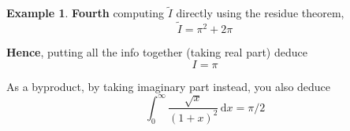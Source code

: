 \documentclass[a4paper, 12pt]{article}
\theoremstyle{definition}
\newtheorem{example}{Example}
\numberwithin{theorem}{section}
\numberwithin{definition}{section}
\numberwithin{exercise}{section}
\numberwithin{remark}{section}
\numberwithin{figure}{section}
\numberwithin{example}{section}
\newcommand{\intd}{\,\text{d}}
\begin{document}
\begin{example}
    \textbf{Fourth}
    computing $\tilde I$ directly using the residue theorem,
    \begin{equation*}
        \tilde I = \pi^2 + 2\pi
    \end{equation*}

    \textbf{Hence},
    putting all the info together (taking real part)
    deduce
    \begin{equation*}
        I = \pi
    \end{equation*}

    As a byproduct, by taking imaginary part instead, you also deduce
    \begin{equation*}
        \int_{0}^{\infty} \frac{\sqrt{x}}{\left( 1+x \right)^2} \intd x = \pi / 2
    \end{equation*}
\end{example}

\end{document}

